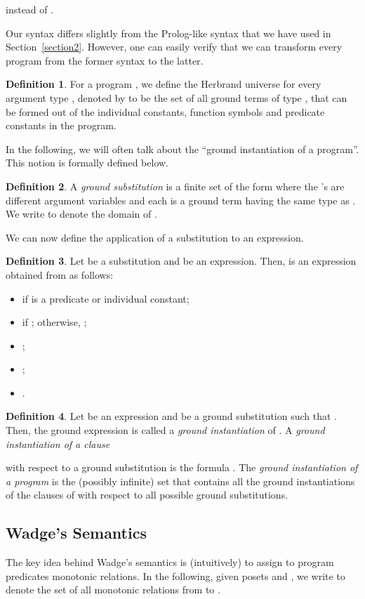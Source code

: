 \documentclass[submission,copyright]{eptcs}
\theoremstyle{definition}
\newtheorem{definition}{Definition}
\begin{document}
instead of .



Our syntax differs slightly from the Prolog-like syntax that we have used in Section~\ref{section2}.
However, one can easily verify that we can transform every program from the former syntax to the latter.



\begin{definition}
For a program , we define the Herbrand universe for every argument type , denoted by
 to be the set of all ground terms of type , that can be formed out of the individual constants, function symbols and predicate constants in the program.
\end{definition}
In the following, we will often talk about the ``ground instantiation of a program''. This
notion is formally defined below.
\begin{definition}
A {\em ground substitution}  is a finite set of the form 
where the 's are different argument variables and each 
is a ground term having the same type as . We write
 to denote the domain of .
\end{definition}
We can now define the application of a substitution to an expression.
\begin{definition}
Let  be a substitution and  be an expression. Then, 
is an expression obtained from  as follows:
\begin{itemize}
  \item  if  is a predicate or individual constant;
  \item  if ; otherwise, ;
  \item ;
  \item ;
  \item .
\end{itemize}
\end{definition}
\begin{definition}
Let  be an expression and  be a ground substitution such that
. Then, the ground expression 
is called a {\em ground instantiation} of . A {\em ground instantiation of a clause}

with respect to a ground substitution  is the formula
.
The {\em ground instantiation of a program}  is the (possibly infinite)
set that contains all the ground instantiations of the clauses of 
with respect to all possible ground substitutions.
\end{definition}


\subsection{Wadge's Semantics}
\label{sec:hosem}
The key idea behind Wadge's semantics is (intuitively) to assign to program
predicates monotonic relations. In the following, given posets  and ,
we write  to denote the set of all monotonic
relations from  to .
\end{document}
